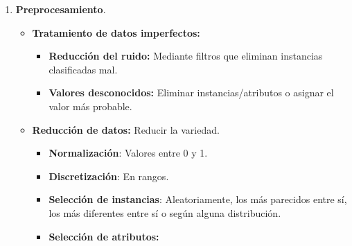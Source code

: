 \documentclass[12pt, twoside, openright]{report} %
\begin{document}
\begin{enumerate}
	\def\labelenumi{\arabic{enumi}.}
	\item \textbf{Preprocesamiento}.

	      \begin{itemize}
		      \item \textbf{Tratamiento de datos imperfectos:}

		            \begin{itemize}
			            \item \textbf{Reducción del ruido:} Mediante filtros que eliminan
			                  instancias clasificadas mal.
			            \item \textbf{Valores desconocidos:} Eliminar instancias/atributos o
			                  asignar el valor más probable.
		            \end{itemize}
		      \item \textbf{Reducción de datos:} Reducir la variedad.

		            \begin{itemize}
			            \item \textbf{Normalización}: Valores entre 0 y 1.
			            \item \textbf{Discretización}: En rangos.
			            \item \textbf{Selección de instancias}: Aleatoriamente, los más
			                  parecidos entre sí, los más diferentes entre sí o según alguna
			                  distribución.
			            \item \textbf{Selección de atributos:}


\end{itemize}
\end{itemize}
\end{enumerate}
\end{document}
